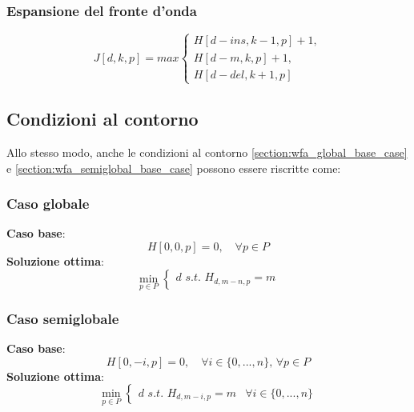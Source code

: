 \subsubsection{Espansione del fronte d'onda}
    \begin{equation}
        J[d, k, p] = max \begin{cases}
            H[d - ins, k - 1, p] + 1, \\
            H[d - m, k, p] + 1, \\
            H[d - del, k + 1, p]
        \end{cases}
    \label{equation:wf_variation_expansion}
    \end{equation}

\subsection{Condizioni al contorno}
    Allo stesso modo, anche le condizioni al contorno \ref{section:wfa_global_base_case} e \ref{section:wfa_semiglobal_base_case} possono essere riscritte come:

\subsubsection{Caso globale}
    \textbf{Caso base}:
    \begin{equation}
        H[0, 0, p] = 0, \quad \forall p \in P 
        \label{section:wfa_variation_global_base_case}
    \end{equation}
    \textbf{Soluzione ottima}:
    \begin{equation}
        \min_{p \in P} \begin{cases}
            d \, \, s.t. \, \, H_{d, m-n, p} = m
        \end{cases}
        \label{section:wfa_variation_global_optimal}
    \end{equation}

\subsubsection{Caso semiglobale}
    \textbf{Caso base}:
    \begin{equation}
        H[0, -i, p] = 0, \quad \forall i \in \{0, ..., n\}, \, \forall p \in P 
        \label{section:wfa_variation_semiglobal_base_case}
    \end{equation}
    \textbf{Soluzione ottima}:
    \begin{equation}
        \min_{p \in P} \begin{cases}
            d \, \, s.t. \, \, H_{d, m-i, p} = m &  \forall i \in \{0, ..., n\}
        \end{cases}
        \label{section:wfa_variation_semiglobal_optimal}
    \end{equation}

